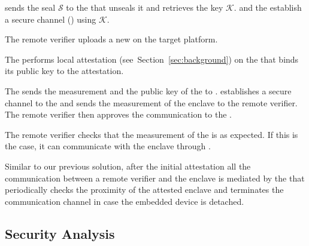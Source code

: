 \begin{mylist}


  \item[\one] \device sends the seal $\mathcal{S}$ to the \nameclave that unseals it and retrieves the key $\mathcal{K}$. \device and the \nameclave establish a secure channel (\tls) using $\mathcal{K}$.

  \item[\two] The remote verifier uploads a new \app on the target platform.

  \item[\three] The \nameclave performs local attestation (see~Section~\ref{sec:background}) on the \app that binds its public key to the attestation. %

  \item[\four] The \nameclave sends the measurement and the public key of the \app to \device. \device establishes a secure channel to the \app and sends the measurement of the enclave to the remote verifier. The remote verifier then approves the communication to the \app.

  \item[\five] The remote verifier checks that the measurement of the \app is as expected. If this is the case, it can communicate with the enclave through \device.

\end{mylist}


Similar to our previous solution, after the initial attestation all the communication between a remote verifier and the enclave is mediated by the \device that periodically checks the proximity of the attested enclave and terminates the communication channel in case the embedded device is detached.


\subsection{Security Analysis}


